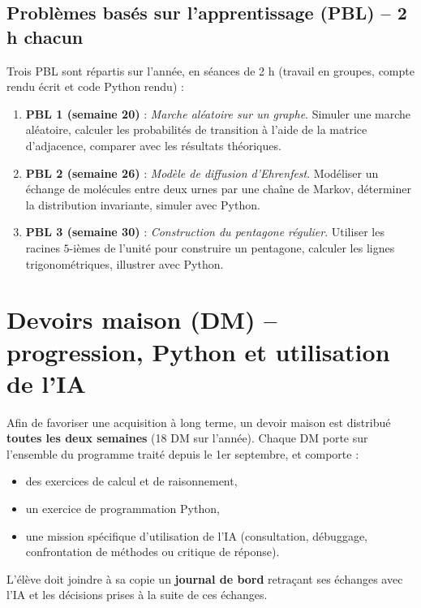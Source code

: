 \documentclass[a4paper,12pt]{article}
\begin{document}
	\subsection{Problèmes basés sur l’apprentissage (PBL) – 2 h chacun}
	Trois PBL sont répartis sur l’année, en séances de 2 h (travail en groupes, compte rendu écrit et code Python rendu) :
	
	\begin{enumerate}
		\item \textbf{PBL 1 (semaine 20)} : \emph{Marche aléatoire sur un graphe}. Simuler une marche aléatoire, calculer les probabilités de transition à l’aide de la matrice d’adjacence, comparer avec les résultats théoriques.
		\item \textbf{PBL 2 (semaine 26)} : \emph{Modèle de diffusion d’Ehrenfest}. Modéliser un échange de molécules entre deux urnes par une chaîne de Markov, déterminer la distribution invariante, simuler avec Python.
		\item \textbf{PBL 3 (semaine 30)} : \emph{Construction du pentagone régulier}. Utiliser les racines $5$-ièmes de l’unité pour construire un pentagone, calculer les lignes trigonométriques, illustrer avec Python.
	\end{enumerate}
	
	\section{Devoirs maison (DM) -- progression, Python et utilisation de l’IA}
	
	Afin de favoriser une acquisition à long terme, un devoir maison est distribué \textbf{toutes les deux semaines} (18 DM sur l’année).  
	Chaque DM porte sur l’ensemble du programme traité depuis le 1er septembre, et comporte :
	\begin{itemize}
		\item des exercices de calcul et de raisonnement,
		\item un exercice de programmation Python,
		\item une mission spécifique d’utilisation de l’IA (consultation, débuggage, confrontation de méthodes ou critique de réponse).
	\end{itemize}
	
	L’élève doit joindre à sa copie un \textbf{journal de bord} retraçant ses échanges avec l’IA et les décisions prises à la suite de ces échanges.
	
\end{document}

